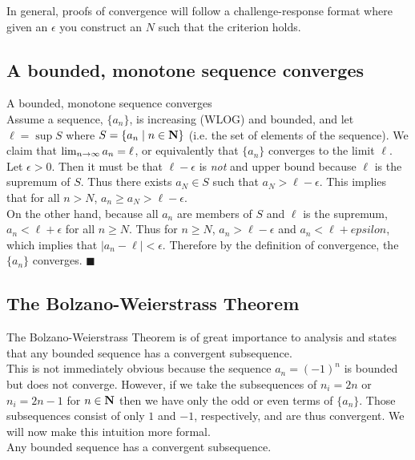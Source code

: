 \documentclass[12pt]{article}
\begin{document}
    In general, proofs of convergence will follow a challenge-response format where given an $\epsilon$
    you construct an $N$ such that the criterion holds.\\

  \subsection{A bounded, monotone sequence converges}
    \thm A bounded, monotone sequence converges\\

    \pf Assume a sequence, $\{a_n\}$, is increasing (WLOG) and bounded, and let $\ell = \sup S$ where 
    $S = \{a_n \mid n \in \mathbf{N}\}$ (i.e. the set of elements of the sequence). We claim that 
    $\lim_{n \to \infty} a_n = \ell$, or equivalently that $\{a_n\}$ converges to the limit $\ell$.\\

    Let $\epsilon > 0$. Then it must be that $\ell - \epsilon$ is \emph{not} and upper bound because
    $\ell$ is the supremum of $S$. Thus there exists $a_N \in S$ such that $a_N > \ell - \epsilon$. This
    implies that for all $n > N$, $a_n \geq a_N > \ell - \epsilon$.\\

    On the other hand, because all $a_n$ are members of $S$ and $\ell$ is the supremum, $a_n < \ell + \epsilon$
    for all $n \geq N$. Thus for $n \geq N$, $a_n > \ell - \epsilon$ and $a_n < \ell + epsilon$, which implies
    that $|a_n - \ell| < \epsilon$. Therefore by the definition of convergence, the $\{a_n\}$ converges. $\blacksquare$
  \subsection{The Bolzano-Weierstrass Theorem}
    The Bolzano-Weierstrass Theorem is of great importance to analysis and states that any bounded sequence has a 
    convergent subsequence.\\
    
    This is not immediately obvious because the sequence $a_n = (-1)^n$ is bounded but does not converge. 
    However, if we take the subsequences of $n_i = 2n$ or $n_i = 2n-1$ for $n \in \mathbf{N}$ then we have only 
    the odd or even terms of $\{a_n\}$. Those subsequences consist of only $1$ and $-1$, respectively, and are 
    thus convergent. We will now make this intuition more formal.\\

    \thm Any bounded sequence has a convergent subsequence.\\

    \pf
\end{document}
